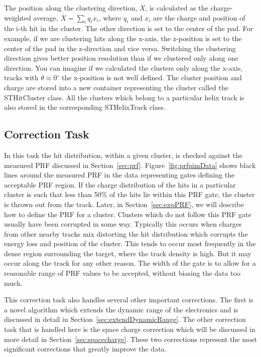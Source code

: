  The position along the clustering direction, $\overline{X}$, is calculated as the charge-weighted average, $\overline{X} = \sum_i q_ix_i$, where $q_i$ and $x_i$ are the charge and position of the i-th hit in the cluster. The other direction is set to the center of the pad. For example, if we are clustering hits along the x-axis, the z-position is set to the center of the pad in the z-direction and vice versa. Switching the clustering direction gives better position resolution than if we clustered only along one direction. You can imagine if we calculated the clusters only along the x-axis, tracks with $\theta \approx 0^{\circ}$ the x-position is not well defined. The cluster position and charge are stored into a new container representing the cluster called the STHitCluster class. All the clusters which belong to a particular helix track is also stored in the corresponding STHelixTrack class. 

\subsection{Correction Task}
\label{sec:corrTask}
In this task the hit distribution, within a given cluster, is checked against the measured PRF discussed in Section~\ref{sec:prf}. Figure~\ref{fig:prfpimData} shows black lines around the measured PRF in the data representing gates defining the acceptable PRF region. If the charge distribution of the hits in a particular cluster is such that less than 50\% of the hits lie within this PRF gate, the cluster is thrown out from the track. Later, in Section~\ref{sec:expPRF}, we will describe how to define the PRF for a cluster. Clusters which do not follow this PRF gate usually have been corrupted in some way. Typically this occurs when charges from other nearby tracks mix distorting the hit distribution which corrupts the energy loss and position of the cluster. This tends to occur most frequently in the dense region surrounding the target, where the track density is high. But it may occur along the track for any other reason. The width of the gate is to allow for a reasonable range of PRF values to be accepted, without biasing the data too much.   


This correction task also handles several other important corrections. The first is a novel algorithm which extends the dynamic range of the electronics and is discussed in detail in Section~\ref{sec:extendDynamicRange}. The other correction task that is handled here is the space charge correction which will be discussed in more detail in Section~\ref{sec:spacecharge}. These two corrections represent the most significant corrections that greatly improve the data. 


